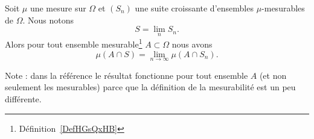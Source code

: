 
\begin{proposition} \label{PropAFNPSsm}
    Soit \( \mu\) une mesure sur \( \Omega\) et \( (S_n)\) une suite croissante d'ensembles \( \mu\)-mesurables de \( \Omega\). Nous notons
    \begin{equation}
        S=\lim_nS_n.
    \end{equation}
    Alors pour tout ensemble mesurable\footnote{Définition~\ref{DefHGsQxHB}} \( A\subset\Omega\) nous avons
    \begin{equation}
        \mu(A\cap S)=\lim_{n\to \infty} \mu(A\cap S_n).
    \end{equation}
\end{proposition}
Note : dans la référence le résultat fonctionne pour tout ensemble \( A\) (et non seulement les mesurables) parce que la définition de la mesurabilité est un peu différente.

